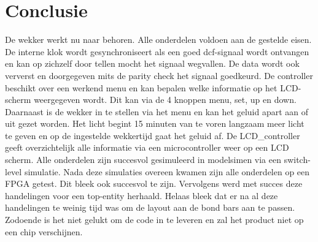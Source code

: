 \chapter{Conclusie}

De wekker werkt nu naar behoren. Alle onderdelen voldoen aan de gestelde eisen. De interne klok wordt gesynchroniseert als een goed dcf-signaal wordt ontvangen en kan op zichzelf door tellen mocht het signaal wegvallen. De data wordt ook ververst en doorgegeven mits de parity check het signaal goedkeurd. De controller beschikt over een werkend menu en kan bepalen welke informatie op het LCD-scherm weergegeven wordt. Dit kan via de 4 knoppen menu, set, up en down. Daarnaast is de wekker in te stellen via het menu en kan het geluid apart aan of uit gezet worden. Het licht begint 15 minuten van te voren langzaam meer licht te geven en op de ingestelde wekkertijd gaat het geluid af.  De LCD\_controller geeft overzichtelijk alle informatie via een microcontroller weer op een LCD scherm.
Alle onderdelen zijn succesvol gesimuleerd in modelsim\textregistered en via een switch-level simulatie. Nada deze simulaties overeen kwamen zijn alle onderdelen op een FPGA getest. Dit bleek ook succesvol te zijn. Vervolgens werd met succes deze handelingen voor een top-entity herhaald.
Helaas bleek dat er na al deze handelingen te weinig tijd was om de layout aan de bond bars aan te passen. Zodoende is het niet gelukt om de code in te leveren en zal het product niet op een chip verschijnen.



% 
